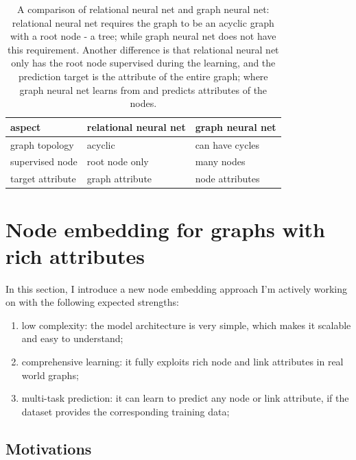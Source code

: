 \documentclass{article}
\begin{document}
\begin{table}[h]
	\centering
	\begin{tabularx}{\textwidth}{ |X|X|X| } \hline
		aspect  & relational neural net & graph neural net \\ \hline
		graph topology & acyclic & can have cycles \\ \hline
		supervised node & root node only & many nodes \\ \hline
		target attribute & graph attribute & node attributes \\ \hline
	\end{tabularx}
	\caption{A comparison of relational neural net and graph neural net: relational neural net requires the graph to be an acyclic graph with a root node - a tree; while graph neural net does not have this requirement. Another difference is that relational neural net only has the root node supervised during the learning, and the prediction target is the attribute of the entire graph; where graph neural net learns from and predicts attributes of the nodes.}
	\label{tab:graphVSrelational}
\end{table}

\section{Node embedding for graphs with rich attributes}

In this section, I introduce a new node embedding approach I'm actively working on with the following expected strengths:
\begin{enumerate}
	\item low complexity: the model architecture is very simple, which makes it scalable and easy to understand;
	\item comprehensive learning: it fully exploits rich node and link attributes in real world graphs;
	\item multi-task prediction: it can learn to predict any node or link attribute, if the dataset provides the corresponding training data;
\end{enumerate}

\subsection{Motivations}
\end{document}
